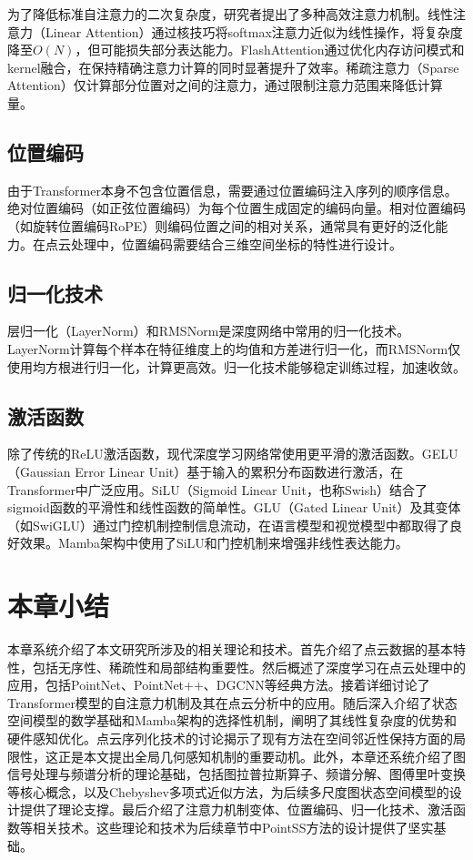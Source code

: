 \documentclass[12pt,a4paper,openany,oneside]{ctexbook}
\theoremstyle{definition}
\theoremstyle{remark}
\begin{document}
为了降低标准自注意力的二次复杂度，研究者提出了多种高效注意力机制。线性注意力（Linear Attention）\cite{katharopoulos2020transformers}通过核技巧将softmax注意力近似为线性操作，将复杂度降至$O(N)$，但可能损失部分表达能力。FlashAttention\cite{dao2022flashattention}通过优化内存访问模式和kernel融合，在保持精确注意力计算的同时显著提升了效率。稀疏注意力（Sparse Attention）仅计算部分位置对之间的注意力，通过限制注意力范围来降低计算量。

\subsection{位置编码}

由于Transformer本身不包含位置信息，需要通过位置编码注入序列的顺序信息。绝对位置编码（如正弦位置编码\cite{vaswani2017attention}）为每个位置生成固定的编码向量。相对位置编码（如旋转位置编码RoPE\cite{su2024roformer}）则编码位置之间的相对关系，通常具有更好的泛化能力。在点云处理中，位置编码需要结合三维空间坐标的特性进行设计。

\subsection{归一化技术}

层归一化（LayerNorm）\cite{ba2016layer}和RMSNorm\cite{zhang2019root}是深度网络中常用的归一化技术。LayerNorm计算每个样本在特征维度上的均值和方差进行归一化，而RMSNorm仅使用均方根进行归一化，计算更高效。归一化技术能够稳定训练过程，加速收敛。

\subsection{激活函数}

除了传统的ReLU激活函数，现代深度学习网络常使用更平滑的激活函数。GELU（Gaussian Error Linear Unit）\cite{hendrycks2016gaussian}基于输入的累积分布函数进行激活，在Transformer中广泛应用。SiLU（Sigmoid Linear Unit，也称Swish）\cite{ramachandran2017searching}结合了sigmoid函数的平滑性和线性函数的简单性。GLU（Gated Linear Unit）\cite{dauphin2017language}及其变体（如SwiGLU）通过门控机制控制信息流动，在语言模型和视觉模型中都取得了良好效果。Mamba架构中使用了SiLU和门控机制来增强非线性表达能力。

\section{本章小结}

本章系统介绍了本文研究所涉及的相关理论和技术。首先介绍了点云数据的基本特性，包括无序性、稀疏性和局部结构重要性。然后概述了深度学习在点云处理中的应用，包括PointNet、PointNet++、DGCNN等经典方法。接着详细讨论了Transformer模型的自注意力机制及其在点云分析中的应用。随后深入介绍了状态空间模型的数学基础和Mamba架构的选择性机制，阐明了其线性复杂度的优势和硬件感知优化。点云序列化技术的讨论揭示了现有方法在空间邻近性保持方面的局限性，这正是本文提出全局几何感知机制的重要动机。此外，本章还系统介绍了图信号处理与频谱分析的理论基础，包括图拉普拉斯算子、频谱分解、图傅里叶变换等核心概念，以及Chebyshev多项式近似方法，为后续多尺度图状态空间模型的设计提供了理论支撑。最后介绍了注意力机制变体、位置编码、归一化技术、激活函数等相关技术。这些理论和技术为后续章节中PointSS方法的设计提供了坚实基础。
\end{document}
